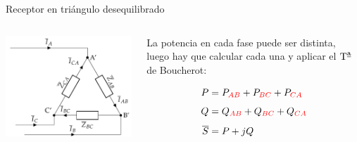 \documentclass[aspectratio=169, usenames,svgnames,dvipsnames]{beamer}
\begin{document}
\begin{frame}{Receptor en triángulo desequilibrado} \label{diapo:triangulo_desequilibrado}
    \begin{columns}
    \begin{column}{0.5\columnwidth}
        \hspace{-5mm}
        \includegraphics[width=1.05\linewidth]{../figs/TrianguloDesequilibrado_Receptor.pdf}
    \end{column}
    
    \begin{column}{0.5\columnwidth}
        La \alert{potencia} en cada fase puede ser \alert{distinta}, luego hay que calcular cada una y aplicar el $\mbox{T}^{\textrm{\underline{a}}}$ de Boucherot:
    
        \begin{align*}
          P &= P_{\color{red}AB} + P_{\color{red}BC} + P_{\color{red}CA}\\[4pt]
          Q &= Q_{\color{red}AB} + Q_{\color{red}BC} + Q_{\color{red}CA}\\[4pt]
          \overline{S} &= P + jQ
        \end{align*}
    \end{column}
    \end{columns}
\end{frame}

\end{document}
